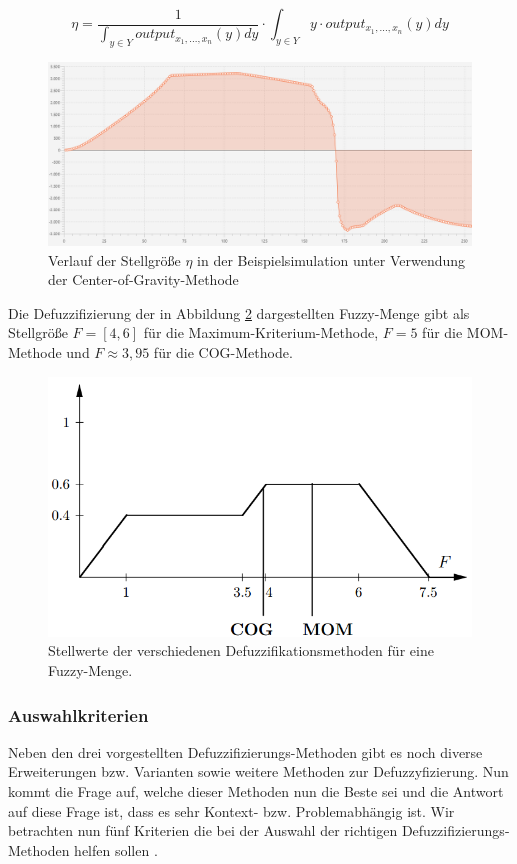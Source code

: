 \documentclass[12pt,a4paper,bibliography=totocnumbered,listof=totocnumbered, abstracton]{scrartcl}
\theoremstyle{Umgebung}
\begin{document}
\begin{equation}
\eta = \frac{1}{\int_{y \in Y} output_{x_1,..., x_n}(y) dy} \cdot \int_{y \in Y} y \cdot output_{x_1,..., x_n}(y)dy
\end{equation}

\begin{figure}
	\centering
	\includegraphics[width=0.8\linewidth]{img/defuzzy/center1}
	\caption{Verlauf der Stellgröße $\eta$ in der Beispielsimulation unter Verwendung der Center-of-Gravity-Methode}
	\label{fig:cog}
\end{figure}

\begin{bsp}
	Die Defuzzifizierung der in Abbildung \ref{fig:defuzzy} dargestellten Fuzzy-Menge gibt als Stellgröße $F = \left[4,6\right]$ für die Maximum-Kriterium-Methode, $F = 5$ für die MOM-Methode und $F \approx 3,95$ für die COG-Methode.
\end{bsp}

\begin{figure}
	\centering
	\includegraphics[width=0.7\linewidth]{img/defuzzy/defuzzy}
	\caption{Stellwerte der verschiedenen Defuzzifikationsmethoden für eine Fuzzy-Menge.}
	\label{fig:defuzzy}
\end{figure}

\subsubsection{Auswahlkriterien}

Neben den drei vorgestellten Defuzzifizierungs-Methoden gibt es noch diverse Erweiterungen bzw. Varianten sowie weitere Methoden zur Defuzzyfizierung. Nun kommt die Frage auf, welche dieser Methoden nun die Beste sei und die Antwort auf diese Frage ist, dass es sehr Kontext- bzw. Problemabhängig ist. Wir betrachten nun fünf Kriterien die bei der Auswahl der richtigen Defuzzifizierungs-Methoden helfen sollen \cite{175683}.
\end{document}
